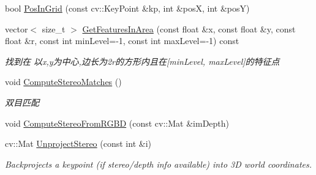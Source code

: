 \begin{DoxyCompactItemize}
bool \mbox{\hyperlink{class_o_r_b___s_l_a_m2_1_1_frame_ae2bc4b1482d2010511da5423d298c9bd}{Pos\+In\+Grid}} (const cv\+::\+Key\+Point \&kp, int \&posX, int \&posY)
\item 
vector$<$ size\+\_\+t $>$ \mbox{\hyperlink{class_o_r_b___s_l_a_m2_1_1_frame_a922a340f438ed0ddd2d7d2a9f95872b6}{Get\+Features\+In\+Area}} (const float \&x, const float \&y, const float \&r, const int min\+Level=-\/1, const int max\+Level=-\/1) const
\begin{DoxyCompactList}\small\item\em 找到在 以x,y为中心,边长为2r的方形内且在\mbox{[}min\+Level, max\+Level\mbox{]}的特征点 \end{DoxyCompactList}\item 
void \mbox{\hyperlink{class_o_r_b___s_l_a_m2_1_1_frame_a77a570d7851bad90ca31c4d55a5105e7}{Compute\+Stereo\+Matches}} ()
\begin{DoxyCompactList}\small\item\em 双目匹配 \end{DoxyCompactList}\item 
void \mbox{\hyperlink{class_o_r_b___s_l_a_m2_1_1_frame_a2818781adf6aec30b8bd8783ba228dce}{Compute\+Stereo\+From\+R\+G\+BD}} (const cv\+::\+Mat \&im\+Depth)
\item 
cv\+::\+Mat \mbox{\hyperlink{class_o_r_b___s_l_a_m2_1_1_frame_a46084d187e1fc60181e1c72f77c733ca}{Unproject\+Stereo}} (const int \&i)
\begin{DoxyCompactList}\small\item\em Backprojects a keypoint (if stereo/depth info available) into 3D world coordinates. \end{DoxyCompactList}\end{DoxyCompactItemize}
